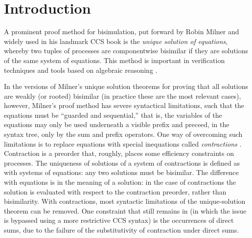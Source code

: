 \section{Introduction}

A prominent proof method for bisimulation, put forward by Robin Milner and widely used in his
landmark CCS book \cite{Mil89} is the
\emph{unique solution of equations}, whereby two tuples of processes are
componentwise bisimilar if they are solutions 
of the same system of equations.
This method is important in verification techniques and tools
based on algebraic reasoning \cite{RosUnder10,BaeBOOK,theoryAndPractice}. 

In the versions of Milner's unique solution theorems for proving that all
solutions are weakly (or rooted) bisimilar (in practice these are the most
relevant cases), however,
Milner's proof method has severe syntactical limitations, such that
the equations must be ``guarded and sequential,'' that is, the
variables of the equations may only be used underneath a visible
prefix and preceed, in the syntax tree, only by the sum and prefix operators.
One way of overcoming such limitations is to replace equations
 with special inequations called
\emph{contractions} \cite{sangiorgi2015equations,sangiorgi2017equations}. Contraction is a
preorder that, roughly, places some efficiency
constraints on processes.  The uniqueness of solutions of a system of contractions
is defined as with systems of equations: any two solutions must be bisimilar.
The difference with equations is in the meaning of a solution:
in the case of contractions the solution is evaluated with respect to
the contraction preorder, rather than bisimilarity. 
With contractions, most syntactic limitations of the unique-solution theorem can be
removed.  One constraint that still remains in
\cite{sangiorgi2017equations} (in which the issue is bypassed using a more
restrictive CCS syntax)
is the occurrences of direct sums, due to the failure of the
substitutivity of contraction under direct sums.

